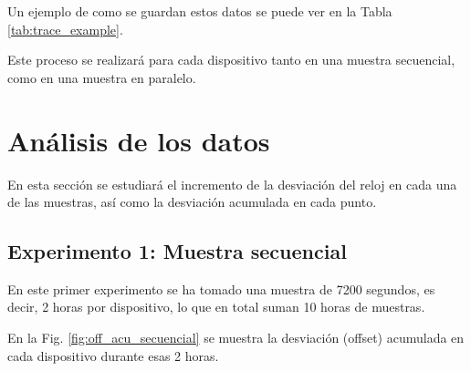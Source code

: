 Un ejemplo de como se guardan estos datos se puede ver en la Tabla \ref{tab:trace_example}.
\begin{table}
    \centering
    \caption{Ejemplo de los datos obtenidos de cada dispositivo}
    \label{tab:trace_example}
\end{table}

Este proceso se realizará para cada dispositivo tanto en una muestra secuencial, como en una muestra en paralelo.


\section{Análisis de los datos}

En esta sección se estudiará el incremento de la desviación del reloj en cada una de las muestras, así como la desviación acumulada en cada punto.

\subsection{Experimento 1: Muestra secuencial}

En este primer experimento se ha tomado una muestra de \SI{7200}{} segundos, es decir, \SI{2}{} horas por dispositivo, lo que en total suman \SI{10}{} horas de muestras.

En la Fig. \ref{fig:off_acu_secuencial} se muestra la desviación (offset) acumulada en cada dispositivo durante esas \SI{2}{} horas.

